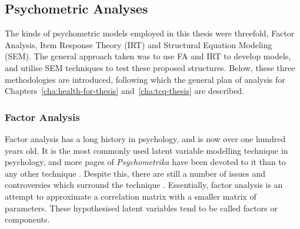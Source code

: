 
\subsection{Psychometric Analyses}
\label{sec:psych-analys-meth}

The kinds of psychometric models employed in this thesis were threefold, Factor Analysis, Item Response Theory (IRT) and Structural Equation Modeling (SEM). The general approach taken was to use FA and IRT to develop models, and utilise SEM techniques to test these proposed structures. Below, these three methodologies are introduced, following which the general plan of analysis for Chapters~\ref{cha:health-for-thesis} and~\ref{cha:tcq-thesis} are described. 

\subsubsection{Factor Analysis}
\label{sec:factor-analysis}
Factor analysis has a long history in psychology, and is now over one hundred years old. It is the most commonly used latent variable modelling technique in psychology, and more pages of \textit{Psychometrika} have been devoted to it than to any other technique \cite{henson2006use}.  Despite this, there are still a number of issues and controversies which surround the technique \cite{sass2010comparative}.  Essentially, factor analysis is an attempt to approximate a correlation matrix with a smaller matrix of parameters.  These hypothesised latent variables tend to be called factors or components.



